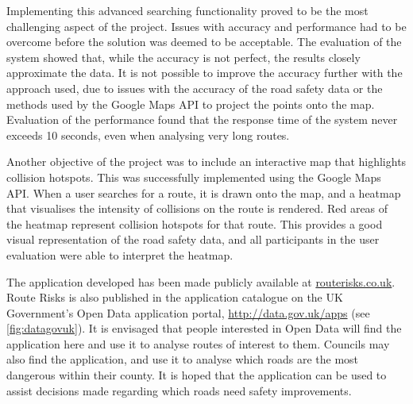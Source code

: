 \documentclass[authoryearcitations]{UoYCSproject}
\begin{document}
Implementing this advanced searching functionality proved to be the most challenging aspect of the project. Issues with accuracy and performance had to be overcome before the solution was deemed to be acceptable. The evaluation of the system showed that, while the accuracy is not perfect, the results closely approximate the data. It is not possible to improve the accuracy further with the approach used, due to issues with the accuracy of the road safety data or the methods used by the Google Maps API to project the points onto the map. Evaluation of the performance found that the response time of the system never exceeds 10 seconds, even when analysing very long routes.

Another objective of the project was to include an interactive map that highlights collision hotspots. This was successfully implemented using the Google Maps API. When a user searches for a route, it is drawn onto the map, and a heatmap that visualises the intensity of collisions on the route is rendered. Red areas of the heatmap represent collision hotspots for that route. This provides a good visual representation of the road safety data, and all participants in the user evaluation were able to interpret the heatmap. 

The application developed has been made publicly available at \url{routerisks.co.uk}. Route Risks is also published in the application catalogue on the UK Government's Open Data application portal, \url{http://data.gov.uk/apps} (see \autoref{fig:datagovuk}). It is envisaged that people interested in Open Data will find the application here and use it to analyse routes of interest to them. Councils may also find the application, and use it to analyse which roads are the most dangerous within their county. It is hoped that the application can be used to assist decisions made regarding which roads need safety improvements. 
\end{document}
